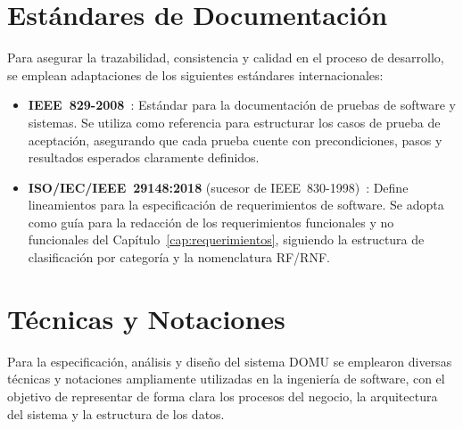 \section{Estándares de Documentación}
Para asegurar la trazabilidad, consistencia y calidad en el proceso de desarrollo, se emplean adaptaciones de los siguientes estándares internacionales:
\begin{itemize}
    \item \textbf{IEEE~829-2008}~\cite{IEEE829-2008}: Estándar para la documentación de pruebas de software y sistemas. Se utiliza como referencia para estructurar los casos de prueba de aceptación, asegurando que cada prueba cuente con precondiciones, pasos y resultados esperados claramente definidos.
    \item \textbf{ISO/IEC/IEEE~29148:2018} (sucesor de IEEE~830-1998)~\cite{IEEE830-1998}: Define lineamientos para la especificación de requerimientos de software. Se adopta como guía para la redacción de los requerimientos funcionales y no funcionales del Capítulo~\ref{cap:requerimientos}, siguiendo la estructura de clasificación por categoría y la nomenclatura RF/RNF.
\end{itemize}

\section{Técnicas y Notaciones}

Para la especificación, análisis y diseño del sistema DOMU se emplearon diversas técnicas y notaciones ampliamente utilizadas en la ingeniería de software, con el objetivo de representar de forma clara los procesos del negocio, la arquitectura del sistema y la estructura de los datos.

